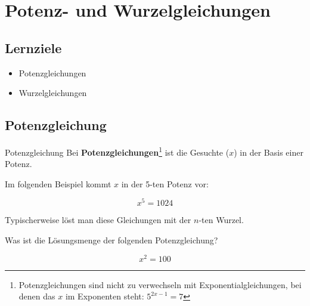
\section{Potenz- und Wurzelgleichungen}

\subsection*{Lernziele}

\begin{itemize}
\item Potenzgleichungen
\item Wurzelgleichungen
\end{itemize}
\newpage


\newpage


\subsection{Potenzgleichung}
\begin{definition}{Potenzgleichung}{}
  Bei \textbf{Potenzgleichungen}\footnote{Potenzgleichungen sind nicht zu
  verwechseln mit Exponentialgleichungen, bei denen das $x$ im
  Exponenten steht: $5^{2x-1}=7$} ist die Gesuchte ($x$) in der Basis
  einer Potenz.
\end{definition}

Im folgenden Beispiel kommt $x$ in der 5-ten Potenz vor:

$$x^5 = 1024$$

Typischerweise löst man diese Gleichungen mit der $n$-ten Wurzel.


Was ist die Lösungsmenge der folgenden Potenzgleichung?

$$x^2 = 100$$


